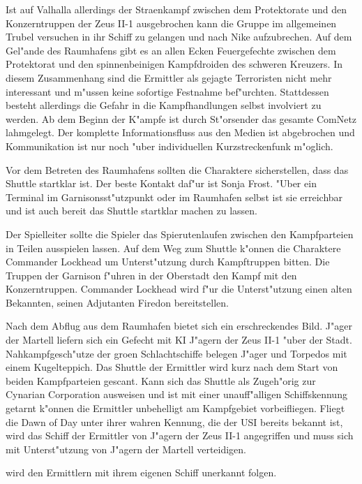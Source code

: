 Ist auf Valhalla allerdings der Stra\3enkampf zwischen dem Protektorate und den Konzerntruppen der Zeus II-1 ausgebrochen kann die Gruppe im allgemeinen Trubel versuchen in ihr Schiff zu gelangen und nach Nike aufzubrechen. Auf dem Gel"ande des Raumhafens gibt es an allen Ecken Feuergefechte zwischen dem Protektorat und den spinnenbeinigen Kampfdroiden des schweren Kreuzers. In diesem Zusammenhang sind die Ermittler als gejagte Terroristen nicht mehr interessant und  m"ussen keine sofortige Festnahme bef"urchten. Stattdessen besteht allerdings die Gefahr in die Kampfhandlungen selbst involviert zu werden. Ab dem Beginn der K"ampfe ist durch St"orsender das gesamte ComNetz lahmgelegt. Der komplette Informationsfluss aus den Medien ist abgebrochen und Kommunikation ist nur noch "uber individuellen Kurzstreckenfunk m"oglich.

Vor dem Betreten des Raumhafens sollten die Charaktere sicherstellen, dass das Shuttle startklar ist. Der beste Kontakt daf"ur ist Sonja Frost. "Uber ein Terminal im Garnisonsst"utzpunkt oder im Raumhafen selbst ist sie erreichbar und ist auch bereit das Shuttle startklar machen zu lassen.

Der Spielleiter sollte die Spieler das Spie\3rutenlaufen zwischen den Kampfparteien in Teilen ausspielen lassen. Auf  dem Weg zum Shuttle k"onnen die Charaktere Commander Lockhead um Unterst"utzung durch Kampftruppen bitten. Die Truppen der Garnison f"uhren in der Oberstadt den Kampf mit den Konzerntruppen. Commander Lockhead wird f"ur die Unterst"utzung einen alten Bekannten, seinen Adjutanten Firedon bereitstellen.

Nach dem Abflug aus dem Raumhafen bietet sich ein erschreckendes Bild. J"ager der Martell liefern sich ein Gefecht mit KI J"agern der Zeus II-1 "uber der Stadt. Nahkampfgesch"utze der gro\3en Schlachtschiffe belegen J"ager und Torpedos mit einem Kugelteppich. Das Shuttle der Ermittler wird kurz nach dem Start von beiden Kampfparteien gescant. Kann sich das 
Shuttle als Zugeh"orig zur Cynarian Corporation ausweisen und ist mit einer unauff"alligen Schiffskennung getarnt k"onnen 
die Ermittler unbehelligt am Kampfgebiet vorbeifliegen. Fliegt die Dawn of Day unter ihrer wahren Kennung, die der USI bereits bekannt ist, wird das Schiff der Ermittler von J"agern der Zeus II-1 angegriffen und muss sich mit Unterst"utzung von J"agern der Martell verteidigen.

\xl{} wird den Ermittlern mit ihrem eigenen Schiff unerkannt folgen.

